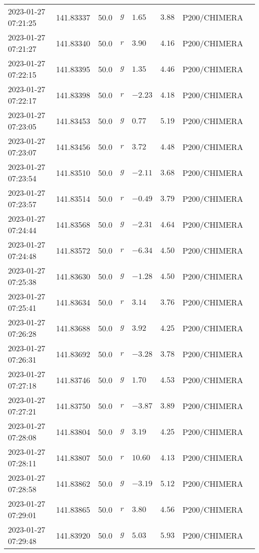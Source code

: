 \documentclass{nature_plusfigure}
\begin{document}
\begin{supplement}
\begin{center}
\begin{longtable}{llllllll}
2023-01-27 07:21:25 & 141.83337 & 50.0 & $g$ & $1.65$ & $3.88$ & P200/CHIMERA &  \\ 
2023-01-27 07:21:27 & 141.83340 & 50.0 & $r$ & $3.90$ & $4.16$ & P200/CHIMERA &  \\ 
2023-01-27 07:22:15 & 141.83395 & 50.0 & $g$ & $1.35$ & $4.46$ & P200/CHIMERA &  \\ 
2023-01-27 07:22:17 & 141.83398 & 50.0 & $r$ & $-2.23$ & $4.18$ & P200/CHIMERA &  \\ 
2023-01-27 07:23:05 & 141.83453 & 50.0 & $g$ & $0.77$ & $5.19$ & P200/CHIMERA &  \\ 
2023-01-27 07:23:07 & 141.83456 & 50.0 & $r$ & $3.72$ & $4.48$ & P200/CHIMERA &  \\ 
2023-01-27 07:23:54 & 141.83510 & 50.0 & $g$ & $-2.11$ & $3.68$ & P200/CHIMERA &  \\ 
2023-01-27 07:23:57 & 141.83514 & 50.0 & $r$ & $-0.49$ & $3.79$ & P200/CHIMERA &  \\ 
2023-01-27 07:24:44 & 141.83568 & 50.0 & $g$ & $-2.31$ & $4.64$ & P200/CHIMERA &  \\ 
2023-01-27 07:24:48 & 141.83572 & 50.0 & $r$ & $-6.34$ & $4.50$ & P200/CHIMERA &  \\ 
2023-01-27 07:25:38 & 141.83630 & 50.0 & $g$ & $-1.28$ & $4.50$ & P200/CHIMERA &  \\ 
2023-01-27 07:25:41 & 141.83634 & 50.0 & $r$ & $3.14$ & $3.76$ & P200/CHIMERA &  \\ 
2023-01-27 07:26:28 & 141.83688 & 50.0 & $g$ & $3.92$ & $4.25$ & P200/CHIMERA &  \\ 
2023-01-27 07:26:31 & 141.83692 & 50.0 & $r$ & $-3.28$ & $3.78$ & P200/CHIMERA &  \\ 
2023-01-27 07:27:18 & 141.83746 & 50.0 & $g$ & $1.70$ & $4.53$ & P200/CHIMERA &  \\ 
2023-01-27 07:27:21 & 141.83750 & 50.0 & $r$ & $-3.87$ & $3.89$ & P200/CHIMERA &  \\ 
2023-01-27 07:28:08 & 141.83804 & 50.0 & $g$ & $3.19$ & $4.25$ & P200/CHIMERA &  \\ 
2023-01-27 07:28:11 & 141.83807 & 50.0 & $r$ & $10.60$ & $4.13$ & P200/CHIMERA &  \\ 
2023-01-27 07:28:58 & 141.83862 & 50.0 & $g$ & $-3.19$ & $5.12$ & P200/CHIMERA &  \\ 
2023-01-27 07:29:01 & 141.83865 & 50.0 & $r$ & $3.80$ & $4.56$ & P200/CHIMERA &  \\ 
2023-01-27 07:29:48 & 141.83920 & 50.0 & $g$ & $5.03$ & $5.93$ & P200/CHIMERA &  \\ 

\end{longtable}
\end{center}
\end{supplement}
\end{document}
